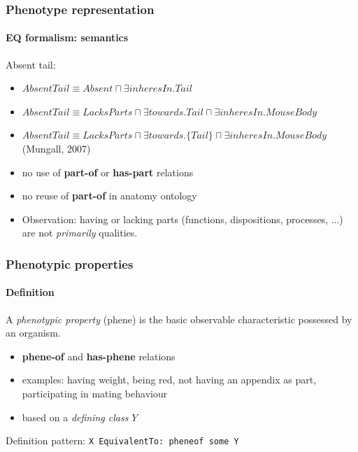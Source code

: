 \documentclass{beamer}
\renewcommand{\em}{\itshape}
\begin{document}
\begin{frame}
\frametitle{Phenotype representation}
\framesubtitle{EQ formalism: semantics}
  Absent tail:
  \begin{itemize}
  \item $AbsentTail \equiv Absent \sqcap \exists inheresIn.Tail$
    \pause
  \item $AbsentTail \equiv LacksParts \sqcap \exists towards.Tail
    \sqcap \exists inheresIn.MouseBody$
    \pause
  \item $AbsentTail \equiv LacksParts \sqcap \exists towards.\{Tail\}
    \sqcap \exists inheresIn.MouseBody$ (Mungall, 2007)
    \pause
  \item no use of {\bf part-of} or {\bf has-part} relations
  \item no reuse of {\bf part-of} in anatomy ontology
    \pause
  \item Observation: having or lacking parts (functions, dispositions,
    processes, ...) are not {\em primarily} qualities.
  \end{itemize}
\end{frame}

\begin{frame}
  \frametitle{Phenotypic properties}
  \framesubtitle{Definition}
  A {\em phenotypic property} (phene) is the basic observable
  characteristic possessed by an organism.
  \begin{itemize}
  \item {\bf phene-of} and {\bf has-phene} relations
  \item examples: having weight, being red, not having an appendix as
    part, participating in mating behaviour
  \item based on a {\em defining class} $Y$
  \end{itemize}
  Definition pattern: \texttt{X EquivalentTo: pheneof some Y}
\end{frame}
\end{document}
